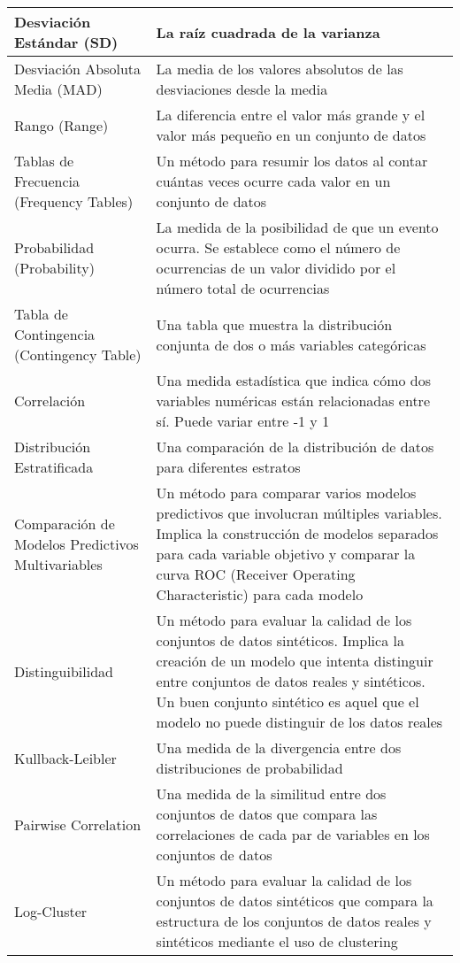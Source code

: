\begin{longtable}{|m{7em}|m{30em}|}
    \hline
    Desviación Estándar (SD) & La raíz cuadrada de la varianza \\
    \hline
    Desviación Absoluta Media (MAD) & La media de los valores absolutos de las desviaciones desde la media \\
    \hline
    Rango (Range) & La diferencia entre el valor más grande y el valor más pequeño en un conjunto de datos \\
    \hline
    Tablas de Frecuencia (Frequency Tables) & Un método para resumir los datos al contar cuántas veces ocurre cada valor en un conjunto de datos \\
    \hline
    Probabilidad (Probability) & La medida de la posibilidad de que un evento ocurra. Se establece como el número de ocurrencias de un valor dividido por el número total de ocurrencias \\
    \hline
    Tabla de Contingencia (Contingency Table) & Una tabla que muestra la distribución conjunta de dos o más variables categóricas \\
    \hline
    Correlación& Una medida estadística que indica cómo dos variables numéricas están relacionadas entre sí. Puede variar entre -1 y 1 \\
    \hline
    Distribución Estratificada & Una comparación de la distribución de datos para diferentes estratos \\
    \hline
    Comparación de Modelos Predictivos Multivariables & Un método para comparar varios modelos predictivos que involucran múltiples variables. Implica la construcción de modelos separados para cada variable objetivo y comparar la curva ROC (Receiver Operating Characteristic) para cada modelo \\
    \hline
    Distinguibilidad & Un método para evaluar la calidad de los conjuntos de datos sintéticos. Implica la creación de un modelo que intenta distinguir entre conjuntos de datos reales y sintéticos. Un buen conjunto sintético es aquel que el modelo no puede distinguir de los datos reales \\
    \hline
    Kullback-Leibler & Una medida de la divergencia entre dos distribuciones de probabilidad \\
    \hline
    Pairwise Correlation & Una medida de la similitud entre dos conjuntos de datos que compara las correlaciones de cada par de variables en los conjuntos de datos \\
    \hline
    Log-Cluster & Un método para evaluar la calidad de los conjuntos de datos sintéticos que compara la estructura de los conjuntos de datos reales y sintéticos mediante el uso de clustering \\

\end{longtable}
